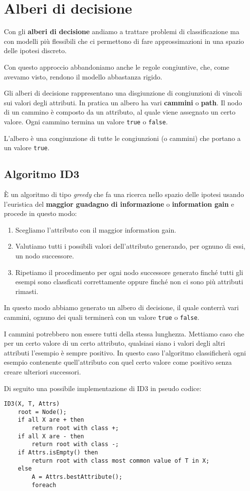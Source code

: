 \chapter{Alberi di decisione}
Con gli \textbf{alberi di decisione} andiamo a trattare problemi di classificazione ma con modelli pi\`u flessibili
che ci permettono di fare approssimazioni in una spazio delle ipotesi discreto.

Con questo approccio abbandoniamo anche le regole congiuntive, che, come avevamo visto, rendono il modello abbastanza
rigido.

Gli alberi di decisione rappresentano una disgiunzione di congiunzioni di vincoli sui valori degli attributi. In
pratica un albero ha vari \textbf{cammini} o \textbf{path}. Il nodo di un cammino \`e composto da un attributo, al
quale viene assegnato un certo valore. Ogni cammino termina un valore \verb|true| o \verb|false|.

L'albero \`e una congiunzione di tutte le congiunzioni (o cammini) che portano a un valore \verb|true|.

\section{Algoritmo ID3}
\`E un algoritmo di tipo \emph{greedy} che fa una ricerca nello spazio delle ipotesi usando l'euristica del
\textbf{maggior guadagno di informazione} o \textbf{information gain} e procede in questo modo:
\begin{enumerate}
	\item Scegliamo l'attributo con il maggior information gain.
	\item Valutiamo tutti i possibili valori dell'attributo generando, per ognuno di essi, un nodo successore.
	\item Ripetiamo il procedimento per ogni nodo successore generato finch\'e tutti gli esempi sono classficati
	      correttamente oppure finch\'e non ci sono pi\`u attributi rimasti.
\end{enumerate}
In questo modo abbiamo generato un albero di decisione, il quale conterr\`a vari cammini, ognuno dei quali terminer\`a
con un valore \verb|true| o \verb|false|.

I cammini potrebbero non essere tutti della stessa lunghezza. Mettiamo caso che per un certo valore di un certo
attributo, qualsiasi siano i valori degli altri attributi l'esempio \`e sempre positivo. In questo caso l'algoritmo
classificher\`a ogni esempio contenente quell'attributo con quel certo valore come positivo senza creare ulteriori
successori.

Di seguito una possibile implementazione di ID3 in pseudo codice:
\begin{lstlisting}[style=pseudo-style]
ID3(X, T, Attrs)
	root = Node();
	if all X are + then
		return root with class +;
	if all X are - then 
		return root with class -;
	if Attrs.isEmpty() then
		return root with class most common value of T in X;
	else
		A = Attrs.bestAttribute();
		foreach
\end{lstlisting}